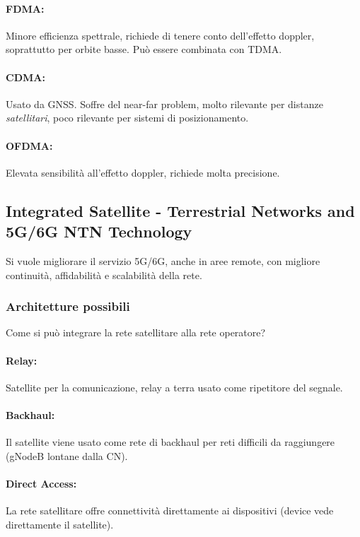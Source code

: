 \paragraph{FDMA:} Minore efficienza spettrale, richiede di tenere conto dell'effetto doppler, soprattutto per orbite basse. Può essere combinata con TDMA.

\paragraph{CDMA:} Usato da GNSS. Soffre del near-far problem, molto rilevante per distanze \textit{satellitari}, poco rilevante per sistemi di posizionamento.

\paragraph{OFDMA:} Elevata sensibilità all'effetto doppler, richiede molta precisione.

\subsection{Integrated Satellite - Terrestrial Networks and 5G/6G NTN Technology}

Si vuole migliorare il servizio 5G/6G, anche in aree remote, con migliore continuità, affidabilità e scalabilità della rete.

\subsubsection{Architetture possibili}

Come si può integrare la rete satellitare alla rete operatore?

\paragraph{Relay:} Satellite per la comunicazione, relay a terra usato come ripetitore del segnale.

\paragraph{Backhaul:} Il satellite viene usato come rete di backhaul per reti difficili da raggiungere (gNodeB lontane dalla CN).

\paragraph{Direct Access:} La rete satellitare offre connettività direttamente ai dispositivi (device vede direttamente il satellite).

